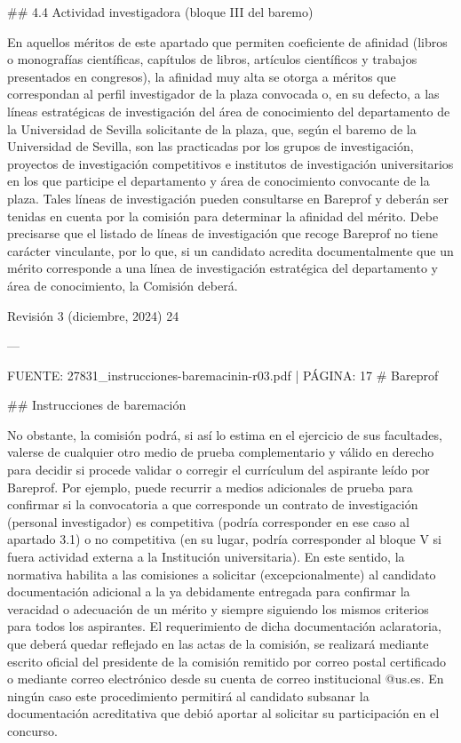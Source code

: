 \documentclass{article}
\begin{document}
\begin{itemize}
\begin{itemize}
\begin{scriptsize}
                  \#\# 4.4 Actividad investigadora (bloque III del baremo)

                  En aquellos méritos de este apartado que permiten coeficiente de afinidad (libros o monografías científicas, capítulos de libros, artículos científicos y trabajos presentados en congresos), la afinidad muy alta se otorga a méritos que correspondan al perfil investigador de la plaza convocada o, en su defecto, a las líneas estratégicas de investigación del área de conocimiento del departamento de la Universidad de Sevilla solicitante de la plaza, que, según el baremo de la Universidad de Sevilla, son las practicadas por los grupos de investigación, proyectos de investigación competitivos e institutos de investigación universitarios en los que participe el departamento y área de conocimiento convocante de la plaza. Tales líneas de investigación pueden consultarse en Bareprof y deberán ser tenidas en cuenta por la comisión para determinar la afinidad del mérito. Debe precisarse que el listado de líneas de investigación que recoge Bareprof no tiene carácter vinculante, por lo que, si un candidato acredita documentalmente que un mérito corresponde a una línea de investigación estratégica del departamento y área de conocimiento, la Comisión deberá.

                  Revisión 3 (diciembre, 2024) 24

                  ---

                  FUENTE: 27831\_instrucciones-baremacinin-r03.pdf | PÁGINA: 17
                  \# Bareprof

                  \#\# Instrucciones de baremación

                  No obstante, la comisión podrá, si así lo estima en el ejercicio de sus facultades, valerse de cualquier otro medio de prueba complementario y válido en derecho para decidir si procede validar o corregir el currículum del aspirante leído por Bareprof. Por ejemplo, puede recurrir a medios adicionales de prueba para confirmar si la convocatoria a que corresponde un contrato de investigación (personal investigador) es competitiva (podría corresponder en ese caso al apartado 3.1) o no competitiva (en su lugar, podría corresponder al bloque V si fuera actividad externa a la Institución universitaria). En este sentido, la normativa habilita a las comisiones a solicitar (excepcionalmente) al candidato documentación adicional a la ya debidamente entregada para confirmar la veracidad o adecuación de un mérito y siempre siguiendo los mismos criterios para todos los aspirantes. El requerimiento de dicha documentación aclaratoria, que deberá quedar reflejado en las actas de la comisión, se realizará mediante escrito oficial del presidente de la comisión remitido por correo postal certificado o mediante correo electrónico desde su cuenta de correo institucional @us.es. En ningún caso este procedimiento permitirá al candidato subsanar la documentación acreditativa que debió aportar al solicitar su participación en el concurso.


\end{scriptsize}
\end{itemize}
\end{itemize}
\end{document}

